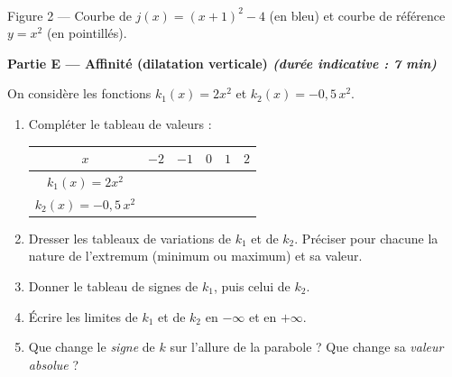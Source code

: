 \documentclass[11pt,a4paper]{article}
\newcommand{\partie}[2]{%
  \vspace{6pt}
  \noindent\colorbox{blue!12}{\parbox{\dimexpr\linewidth-2\fboxsep}{%
    \bfseries\color{blue!50!black} #1 \hfill \normalfont\small\itshape (durée indicative : #2)}}%
  \vspace{4pt}}
\begin{document}
\begin{center}
\\[-2pt]
{\small Figure 2 — Courbe de $j(x)=(x+1)^2-4$ (en bleu) et courbe de référence $y=x^2$ (en pointillés).}
\end{center}

\partie{Partie E — Affinité (dilatation verticale)}{7 min}

On considère les fonctions $k_1(x)=2x^2$ et $k_2(x)=-0{,}5\,x^2$.

\begin{enumerate}[leftmargin=1.4em,itemsep=3pt]
  \item Compléter le tableau de valeurs :
  \begin{center}
  \begin{tabular}{|c|c|c|c|c|c|}
  \hline
  $x$ & $-2$ & $-1$ & $0$ & $1$ & $2$\\ \hline
  $k_1(x)=2x^2$ & & & & & \\ \hline
  $k_2(x)=-0{,}5\,x^2$ & & & & & \\ \hline
  \end{tabular}
  \end{center}

  \item Dresser les tableaux de variations de $k_1$ et de $k_2$. Préciser pour chacune la nature
  de l'extremum (minimum ou maximum) et sa valeur.

  \item Donner le tableau de signes de $k_1$, puis celui de $k_2$.

  \item Écrire les limites de $k_1$ et de $k_2$ en $-\infty$ et en $+\infty$.

  \item Que change le \emph{signe} de $k$ sur l'allure de la parabole ? Que change sa \emph{valeur absolue} ?
\end{enumerate}
\end{document}
